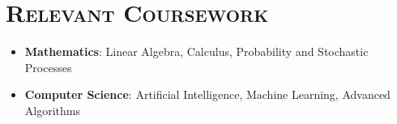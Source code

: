 \documentclass{article}
\makeatletter
\newcommand{\headerrow}[2]
{\begin{tabular*}{\linewidth}{l@{\extracolsep{\fill}}r}
    #1 &
    #2 \\
\end{tabular*}}
\makeatother
\begin{document}
\begin{itemize}[leftmargin=0em]
%

%

\end{itemize}

\section*{\textsc{\textbf{Relevant Coursework}}}
\begin{itemize}[itemsep=0em, leftmargin=0.7em]
\item[]
    \textbf{Mathematics}: Linear Algebra, Calculus, Probability and Stochastic Processes
\item[]
    \textbf{Computer Science}: Artificial Intelligence, Machine Learning, Advanced Algorithms
\end{itemize}
\end{document}
